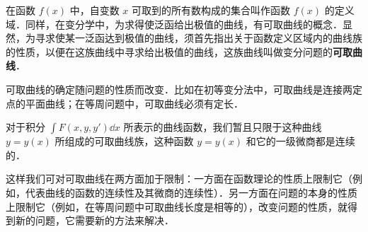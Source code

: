 在函数 $f(x)$ 中，自变数 $x$ 可取到的所有数构成的集合叫作函数 $f(x)$ 的定义域．同样，在变分学中，为求得使泛函给出极值的曲线，有可取曲线的概念．显然，为寻求使某一泛函达到极值的曲线，须首先指出关于函数定义区域内的曲线族的性质，以便在这族曲线中寻求给出极值的曲线，这族曲线叫做变分问题的\textbf{可取曲线}．

可取曲线的确定随问题的性质而改变．比如在初等变分法中，可取曲线是连接两定点的平面曲线；在等周问题中，可取曲线必须有定长．

对于积分 $\int F(x,y,y')\dd x$ 所表示的曲线函数，我们暂且只限于这种曲线 $y=y(x)$ 所组成的可取曲线族，这种函数 $y=y(x)$ 和它的一级微商都是连续的．

这样我们可对可取曲线在两方面加于限制：一方面在函数理论的性质上限制它（例如，代表曲线的函数的连续性及其微商的连续性）．另一方面在问题的本身的性质上限制它（例如，在等周问题中可取曲线长度是相等的），改变问题的性质，就得到新的问题，它需要新的方法来解决．